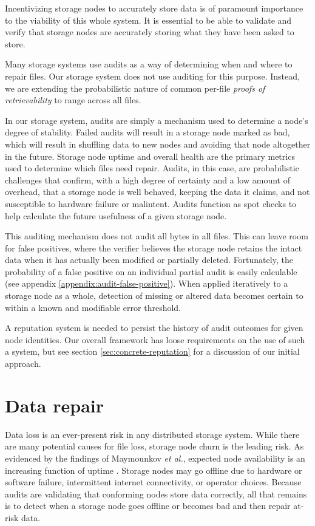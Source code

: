 \documentclass[11pt,fleqn,openany]{book}
\begin{document}
Incentivizing storage nodes to accurately store data is of paramount importance
to
the viability of this whole system. It is essential to be able to
validate and verify that storage nodes are accurately storing what they have
been
asked to store.

Many storage systems use audits as a way of determining when and where to repair
files. Our storage system does not use auditing for this purpose.
Instead, we are extending the probabilistic nature of
common per-file {\em proofs of retrievability} \cite{proof-of-retrievability}
to range across all files.

In our storage system,
audits are simply a mechanism used to determine a node's degree of stability.
Failed audits will result in a storage node marked as bad, which
will result in shuffling data to new nodes and avoiding that node altogether
in the future. Storage node uptime and overall health are the primary metrics
used to determine which files need repair.
Audits, in this case, are probabilistic challenges that confirm, with a high
degree of certainty and a low amount of overhead, that a storage node is well
behaved, keeping the data it claims, and not susceptible to hardware
failure or malintent. Audits function as spot checks to help calculate
the future usefulness of a given storage node.

This auditing mechanism does not audit all bytes in all files. This can
leave room for false positives, where the verifier believes the storage node
retains the intact data when it has actually been modified or partially
deleted. Fortunately, the probability of a false positive on an individual
partial audit is easily calculable (see appendix
\ref{appendix:audit-false-positive}). When applied
iteratively to a storage node as a whole, detection of missing or altered data
becomes certain to within a known and modifiable error threshold.

A reputation system is needed to persist the history of audit outcomes for
given node identities. Our overall framework has loose requirements on the use
of such a system, but see section \ref{sec:concrete-reputation} for a
discussion of our initial approach.

\section{Data repair}

Data loss is an ever-present risk in any distributed storage system. While there
are many potential causes for file loss, storage node churn is the leading
risk. As evidenced by the findings of Maymounkov {\em et al.}, expected node
availability is an increasing function of uptime \cite{kad}. Storage nodes
may go offline due to hardware or software failure, intermittent internet
connectivity, or operator choices.
Because audits are validating that conforming nodes store data correctly, all
that remains is to detect when a storage node goes offline or becomes bad and
then repair at-risk data.
\end{document}
